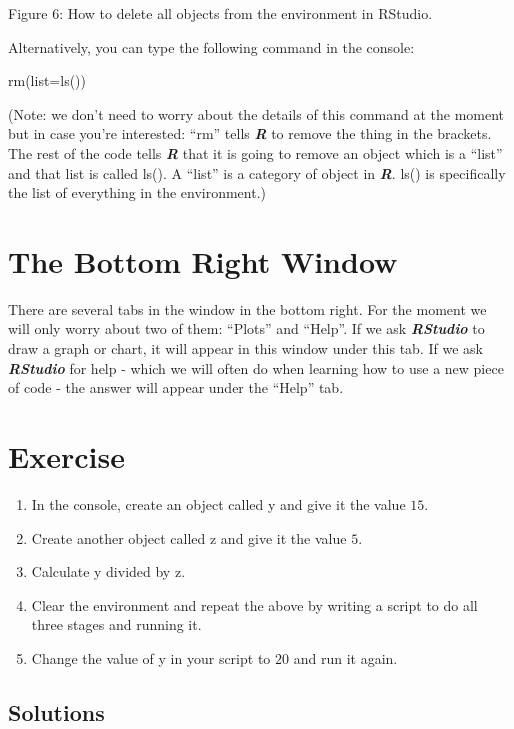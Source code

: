 \documentclass[
]{book}
\providecommand{\tightlist}{%
  \setlength{\itemsep}{0pt}\setlength{\parskip}{0pt}}
\begin{document}
Figure 6: How to delete all objects from the environment in RStudio.

Alternatively, you can type the following command in the console:

rm(list=ls())

(Note: we don't need to worry about the details of this command at the moment but in case you're interested: ``rm'' tells \textbf{\emph{R}} to remove the thing in the brackets. The rest of the code tells \textbf{\emph{R}} that it is going to remove an object which is a ``list'' and that list is called ls(). A ``list'' is a category of object in \textbf{\emph{R}}. ls() is specifically the list of everything in the environment.)

\section{The Bottom Right Window}\label{the-bottom-right-window}

There are several tabs in the window in the bottom right. For the moment we will only worry about two of them: ``Plots'' and ``Help''. If we ask \textbf{\emph{RStudio}} to draw a graph or chart, it will appear in this window under this tab. If we ask \textbf{\emph{RStudio}} for help - which we will often do when learning how to use a new piece of code - the answer will appear under the ``Help'' tab.

\section{Exercise}\label{exercise}

\begin{enumerate}
\def\labelenumi{\arabic{enumi}.}
\tightlist
\item
  In the console, create an object called y and give it the value \(15\).\\
\item
  Create another object called z and give it the value \(5\).\\
\item
  Calculate y divided by z.\\
\item
  Clear the environment and repeat the above by writing a script to do all three stages and running it.
\item
  Change the value of y in your script to \(20\) and run it again.
\end{enumerate}

\subsection{Solutions}\label{solutions}
\end{document}
